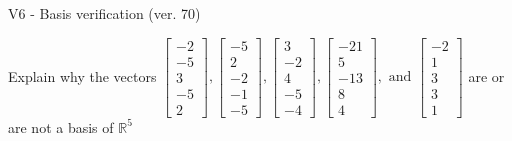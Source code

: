 \begin{exercise}
  \begin{exerciseTitle}V6 - Basis verification (ver. 70)\end{exerciseTitle}
  \begin{exerciseStatement}
    Explain why the vectors \(\left[\begin{array}{r}
-2 \\
-5 \\
3 \\
-5 \\
2
\end{array}\right] , \left[\begin{array}{r}
-5 \\
2 \\
-2 \\
-1 \\
-5
\end{array}\right] , \left[\begin{array}{r}
3 \\
-2 \\
4 \\
-5 \\
-4
\end{array}\right] , \left[\begin{array}{r}
-21 \\
5 \\
-13 \\
8 \\
4
\end{array}\right] , \text{ and } \left[\begin{array}{r}
-2 \\
1 \\
3 \\
3 \\
1
\end{array}\right]\) are or are not a basis of \(\mathbb{R}^5\)	



\end{exerciseStatement}
\end{exercise}
